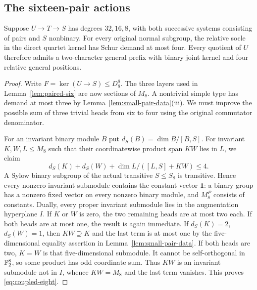 \subsection{The sixteen-pair actions}

\begin{lemma}\label{lem:paired-eight}
Suppose $U\to T\to S$ has degrees $32,16,8$, with both successive
systems consisting of pairs and $S$ nonbinary. For every original
normal subgroup, the relative socle in the direct quartet kernel has
Schur demand at most four. Every quotient of $U$ therefore admits a
two-character general prefix with binary joint kernel and four
relative general positions.
\end{lemma}
\begin{proof}
Write $F=\ker(U\to S)\leq D_8^8$. The three layers used in
Lemma~\ref{lem:paired-six} are now sections of $M_8$. A nontrivial
simple type has demand at most three by
Lemma~\ref{lem:small-pair-data}(iii). We must improve the possible
sum of three trivial heads from six to four using the original
commutator denominator.

For an invariant binary module $B$ put $d_S(B)=\dim B/[B,S]$.
For invariant $K,W,L\leq M_8$ such that their coordinatewise product
span $KW$ lies in $L$, we claim
\begin{equation}\label{eq:coupled-eight}
 d_S(K)+d_S(W)+\dim L/([L,S]+KW)\leq4.
\end{equation}
A Sylow binary subgroup of the actual transitive $S\leq S_8$ is
transitive. Hence every nonzero invariant submodule contains the
constant vector $\boldsymbol1$: a binary group has a nonzero fixed
vector on every nonzero binary module, and $M_8^P$ consists of
constants. Dually, every proper invariant submodule lies in the
augmentation hyperplane $I$.
If $K$ or $W$ is zero, the two remaining heads are at most two each.
If both heads are at most one, the result is again immediate.
If $d_S(K)=2$, $d_S(W)=1$, then $KW\supseteq K$ and the last term
is at most one by the five-dimensional equality assertion in
Lemma~\ref{lem:small-pair-data}. If both heads are two, $K=W$ is
that five-dimensional submodule. It cannot be self-orthogonal in
$\mathbb F_2^8$, so some product has odd coordinate sum. Thus $KW$ is an
invariant submodule not in $I$, whence $KW=M_8$ and the last term
vanishes. This proves \eqref{eq:coupled-eight}.


\end{proof}
